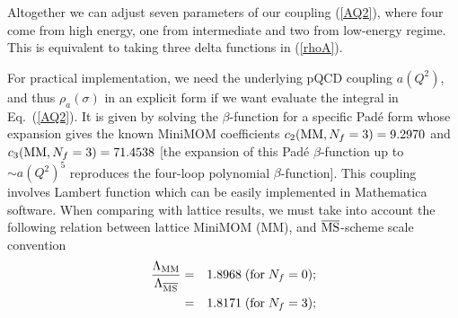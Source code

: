 \documentclass[3p,times,twocolumn]{elsarticle}
\def\bea{\begin{eqnarray}}
\def\eea{\end{eqnarray}}
\newcommand{\A}{{\mathcal{A}}}
\begin{document}
Altogether we can adjust seven parameters of our coupling  (\ref{AQ2}), where four come from high energy, one from  intermediate and two from low-energy regime. This is equivalent to taking three delta functions in (\ref{rhoA}).

For practical implementation, we need the underlying pQCD coupling $a(Q^2)$, and thus $\rho_a(\sigma)$ in an explicit form if we want evaluate the integral in Eq.~(\ref{AQ2}). It is given by solving the $\beta$-function for a specific Pad\'e form \cite{GCIK} whose expansion gives the known MiniMOM coefficients $c_2({\rm MM},N_f=3)=9.2970$ and $c_3({\rm MM},N_f=3)=71.4538$ [the expansion of this Pad\'e $\beta$-function up to $\sim a(Q^2)^5$ reproduces the four-loop polynomial $\beta$-function]. This coupling involves Lambert function which can be easily implemented in Mathematica software. 
When comparing with lattice results, we must take into account the following relation between lattice MiniMOM (MM), \cite{MiniMOM} and $\overline{\rm MS}$-scheme scale convention
\bea
\frac{\Lambda_{\rm MM}}{\Lambda_{\overline{\rm MS}}} &=& 1.8968 \; ({\rm for} \; N_f=0); 
\nonumber\\
&=&1.8171 \; ({\rm for} \; N_f=3);
\label{LambdaMMMSbar}
\eea

\addtocounter{table}{-1}
\end{document}
